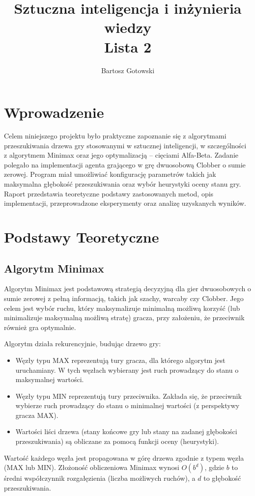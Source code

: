 \documentclass[12pt,a4paper]{article}
\title{\LARGE \textbf{Sztuczna inteligencja i inżynieria wiedzy}\\
\large Lista 2}
\author{Bartosz Gotowski}
\begin{document}
\maketitle

\tableofcontents
\clearpage

\section{Wprowadzenie}
Celem niniejszego projektu było praktyczne zapoznanie się z algorytmami przeszukiwania drzewa gry stosowanymi w sztucznej inteligencji, w szczególności z algorytmem Minimax oraz jego optymalizacją – cięciami Alfa-Beta. Zadanie polegało na implementacji agenta grającego w grę dwuosobową Clobber o sumie zerowej. Program miał umożliwiać konfigurację parametrów takich jak maksymalna głębokość przeszukiwania oraz wybór heurystyki oceny stanu gry. Raport przedstawia teoretyczne podstawy zastosowanych metod, opis implementacji, przeprowadzone eksperymenty oraz analizę uzyskanych wyników.

\section{Podstawy Teoretyczne}
\subsection{Algorytm Minimax}
Algorytm Minimax jest podstawową strategią decyzyjną dla gier dwuosobowych o sumie zerowej z pełną informacją, takich jak szachy, warcaby czy Clobber. Jego celem jest wybór ruchu, który maksymalizuje minimalną możliwą korzyść (lub minimalizuje maksymalną możliwą stratę) gracza, przy założeniu, że przeciwnik również gra optymalnie.

Algorytm działa rekurencyjnie, budując drzewo gry:
\begin{itemize}
    \item Węzły typu MAX reprezentują tury gracza, dla którego algorytm jest uruchamiany. W tych węzłach wybierany jest ruch prowadzący do stanu o maksymalnej wartości.
    \item Węzły typu MIN reprezentują tury przeciwnika. Zakłada się, że przeciwnik wybierze ruch prowadzący do stanu o minimalnej wartości (z perspektywy gracza MAX).
    \item Wartości liści drzewa (stany końcowe gry lub stany na zadanej głębokości przeszukiwania) są obliczane za pomocą funkcji oceny (heurystyki).
\end{itemize}
Wartość każdego węzła jest propagowana w górę drzewa zgodnie z typem węzła (MAX lub MIN). Złożoność obliczeniowa Minimax wynosi $O(b^d)$, gdzie $b$ to średni współczynnik rozgałęzienia (liczba możliwych ruchów), a $d$ to głębokość przeszukiwania.
\end{document}
